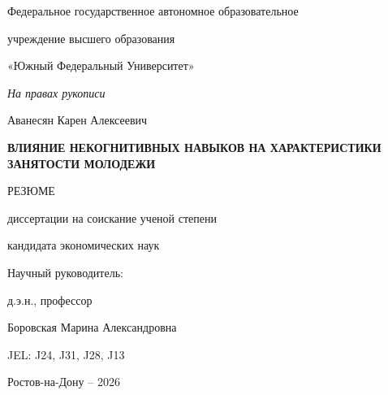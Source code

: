 
\begin{titlepage}
\thispagestyle{empty}
\begin{center}
{\fontsize{16pt}{18.4pt}\selectfont Федеральное государственное автономное образовательное\par}
{\fontsize{16pt}{18.4pt}\selectfont учреждение высшего образования\par}
{\fontsize{16pt}{18.4pt}\selectfont «Южный Федеральный Университет»\par}
\end{center}

\vspace{1.2cm}

\begin{flushright}
{\fontsize{14pt}{16.1pt}\selectfont\itshape На правах рукописи\par}
\end{flushright}

\vspace{2.0cm}

\begin{center}
{\fontsize{16pt}{18.4pt}\selectfont Аванесян Карен Алексеевич\par}

\vspace{1.1cm}

{\fontsize{16pt}{18.4pt}\selectfont\bfseries ВЛИЯНИЕ НЕКОГНИТИВНЫХ НАВЫКОВ НА ХАРАКТЕРИСТИКИ ЗАНЯТОСТИ МОЛОДЕЖИ\par}

\vspace{0.8cm}

{\fontsize{16pt}{18.4pt}\selectfont РЕЗЮМЕ\par}
{\fontsize{16pt}{18.4pt}\selectfont диссертации на соискание ученой степени\par}
{\fontsize{16pt}{18.4pt}\selectfont кандидата экономических наук\par}
\end{center}

\vspace{2.0cm}

\begin{flushright}
{\fontsize{16pt}{18.4pt}\selectfont Научный руководитель:\par}
{\fontsize{16pt}{18.4pt}\selectfont д.э.н., профессор\par}
{\fontsize{16pt}{18.4pt}\selectfont Боровская Марина Александровна\par}

\vspace{1.0cm}

{\fontsize{16pt}{18.4pt}\selectfont JEL: J24, J31, J28, J13\par}
\end{flushright}

\vfill

\begin{center}
{\fontsize{16pt}{18.4pt}\selectfont Ростов-на-Дону -- 2026\par}
\end{center}
\end{titlepage}

\clearpage
{}
\setcounter{page}{2}
